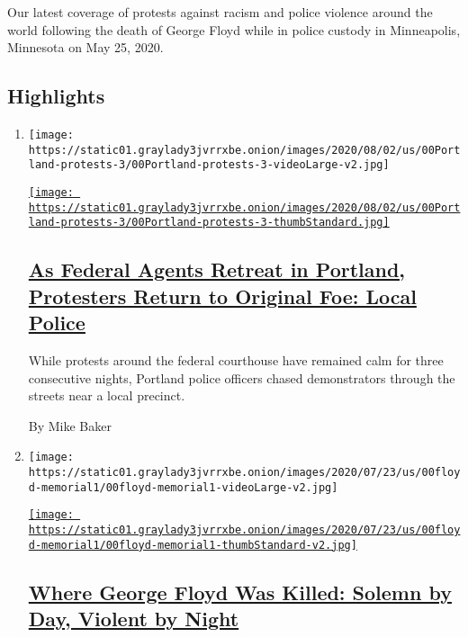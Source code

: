Our latest coverage of protests against racism and police violence
around the world following the death of George Floyd while in police
custody in Minneapolis, Minnesota on May 25, 2020.

\hypertarget{highlights}{%
\subsection{Highlights}\label{highlights}}

\begin{enumerate}
\def\labelenumi{\arabic{enumi}.}
\item
  \texttt{[image: https://static01.graylady3jvrrxbe.onion/images/2020/08/02/us/00Portland-protests-3/00Portland-protests-3-videoLarge-v2.jpg]}

  \href{/2020/08/02/us/portland-protests-.html}{\texttt{[image: https://static01.graylady3jvrrxbe.onion/images/2020/08/02/us/00Portland-protests-3/00Portland-protests-3-thumbStandard.jpg]}}

  \hypertarget{as-federal-agents-retreat-in-portland-protesters-return-to-original-foe-local-police}{%
  \subsection{\texorpdfstring{\href{/2020/08/02/us/portland-protests-.html}{As
  Federal Agents Retreat in Portland, Protesters Return to Original Foe:
  Local
  Police}}{As Federal Agents Retreat in Portland, Protesters Return to Original Foe: Local Police}}\label{as-federal-agents-retreat-in-portland-protesters-return-to-original-foe-local-police}}

  While protests around the federal courthouse have remained calm for
  three consecutive nights, Portland police officers chased
  demonstrators through the streets near a local precinct.

  By Mike Baker
\item
  \texttt{[image: https://static01.graylady3jvrrxbe.onion/images/2020/07/23/us/00floyd-memorial1/00floyd-memorial1-videoLarge-v2.jpg]}

  \href{/2020/07/29/us/george-floyd-memorial.html}{\texttt{[image: https://static01.graylady3jvrrxbe.onion/images/2020/07/23/us/00floyd-memorial1/00floyd-memorial1-thumbStandard-v2.jpg]}}

  \hypertarget{where-george-floyd-was-killed-solemn-by-day-violent-by-night}{%
  \subsection{\texorpdfstring{\href{/2020/07/29/us/george-floyd-memorial.html}{Where
  George Floyd Was Killed: Solemn by Day, Violent by
  Night}}{Where George Floyd Was Killed: Solemn by Day, Violent by Night}}\label{where-george-floyd-was-killed-solemn-by-day-violent-by-night}}


\end{enumerate}
